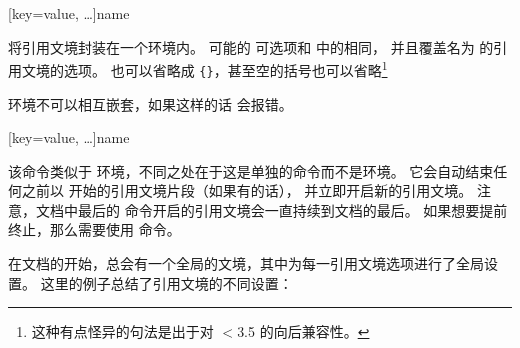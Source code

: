 \begin{ltxsyntax}
\begin{optionlist*}
\end{optionlist*}
%

[key=value, \dots]{name}


将引用文境封装在一个环境内。
可能的 \keyval 可选项和  中的相同，
并且覆盖名为  的引用文境的选项。
 也可以省略成 \verb+{}+，甚至空的括号也可以省略\footnote{
这种有点怪异的句法是出于对 \biblatex $<$3.5 的向后兼容性。}

 环境不可以相互嵌套，如果这样的话 \biblatex 会报错。

[key=value, \dots]{name}

该命令类似于  环境，不同之处在于这是单独的命令而不是环境。
它会自动结束任何之前以  开始的引用文境片段（如果有的话），
并立即开启新的引用文境。
注意，文档中最后的  命令开启的引用文境会一直持续到文档的最后。
如果想要提前终止，那么需要使用  命令。

\end{ltxsyntax}
%

在文档的开始，总会有一个全局的文境，其中为每一引用文境选项进行了全局设置。
这里的例子总结了引用文境的不同设置：

